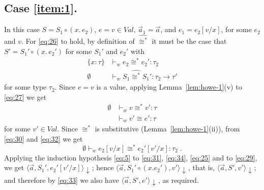 \documentclass{LMCS}
\theoremstyle{plain}
\theoremstyle{definition}
\newcommand{\comp}{\circ}
\newcommand{\config}[3]{\langle#1, #2, #3\rangle}
\newcommand{\CR}[1]{\mathrel{\widehat{#1}}}
\newcommand{\ent}{\vdash}
\renewcommand{\exp}[1][e]{#1}
\newcommand{\FUNTY}{\mathbin{\rightarrow}}
\newcommand{\ofty}{:}
\newcommand{\opeq}{\cong}
\newcommand{\s}[1][a]{\vec{#1}}
\newcommand{\stk}[1][S]{#1}
\newcommand{\sub}[2]{{[#2/#1]}}
\newcommand{\terminates}[1][]{{\downarrow_{#1}}}
\newcommand{\ty}{\tau}
\newcommand{\val}[1][v]{#1}
\newcommand{\Val}{\mathit{Val}}
\newcommand{\vid}[1][x]{#1}
\newcommand{\w}[1][w]{#1}
\begin{document}
  \subsection*{Case \ref{item:1}.} In this case
  $\stk=\stk_1\comp(\vid.\,\exp_2)$, $\exp=\val\in\Val$, $\s_1=\s$, and
  $\exp_1=\exp_2\sub{\vid}{\val}$, for some $\exp_2$ and $\val$. For
  \eqref{eq:26} to hold, by definition of $\CR{\opeq^*}$ it must be the
  case that $\stk'=\stk_1'\comp(\vid.\,\exp_2')$ for some $\stk_1'$ and
  $\exp_2'$ with
  \begin{align}
    \{\vid\ofty\ty\} &\ent_{\w} \exp_2\opeq^* \exp_2'\ofty\ty_2\label{eq:30}\\
    \emptyset &\ent_{\w}
    \stk_1\CR{\opeq^*}\stk_1'\ofty\ty_2\FUNTY\ty'\label{eq:31}
  \end{align}
  for some type $\ty_2$. Since $\exp=\val$ is a value, applying
  Lemma~\ref{lem:howe-1}(v) to \eqref{eq:27} we get
  \begin{align}
    \emptyset &\ent_{\w} \val \opeq^* \val'\ofty\ty\label{eq:32}\\
    {} &\ent_{\w} \val'\opeq \exp'\ofty\ty\label{eq:33}
  \end{align}
  for some $\val'\in\Val$. Since $\opeq^*$ is substitutive
  (Lemma~\ref{lem:howe-1}(ii)), from \eqref{eq:30} and \eqref{eq:32}
  we get
  \begin{equation}
    \label{eq:34}
    \emptyset\ent_{\w} \exp_2\sub{\vid}{\val} \opeq^* 
    \exp_2'\sub{\vid}{\val'}\ofty \ty_2\;.
  \end{equation}
  Applying the induction hypothesis \eqref{eq:5} to \eqref{eq:31},
  \eqref{eq:34}, \eqref{eq:25} and to \eqref{eq:29}, we get
  $\config{\s}{\stk_1'}{\exp_2'\sub{\vid}{\val'}}\terminates$; hence
  $\config{\s}{\stk_1'\comp(\vid.\exp_2')}{\val'}\terminates$, that
  is, $\config{\s}{\stk'}{\val'}\terminates$; and therefore by
  \eqref{eq:33} we also have $\config{\s}{\stk'}{\exp'}\terminates$,
  as required.
\end{document}
